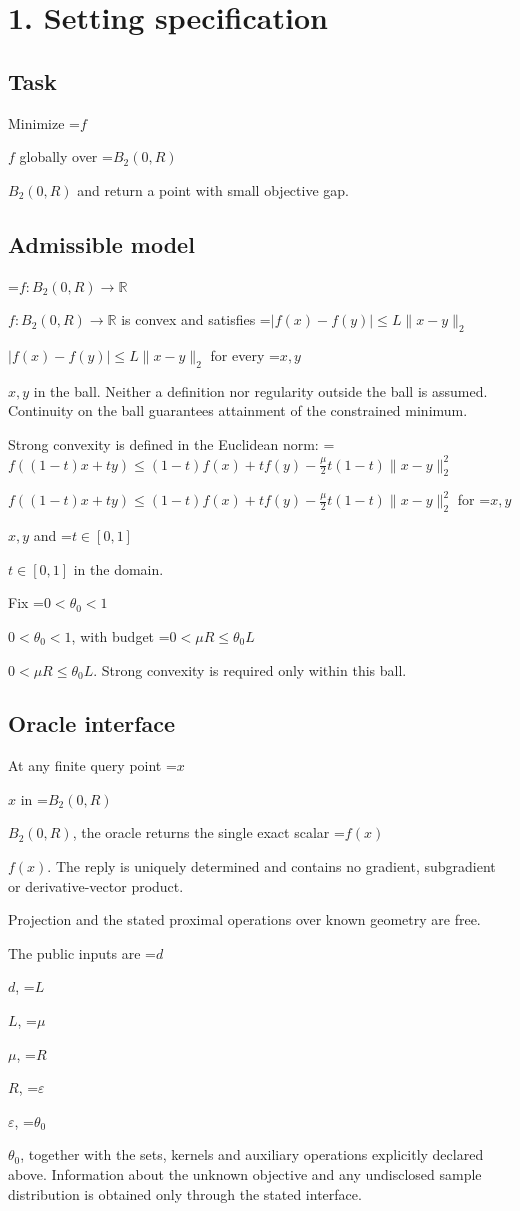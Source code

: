 \documentclass[10pt,a4paper]{article}
\newcommand{\AtlasMath}[1]{\par\begingroup\centering\setbox0=\hbox{$\displaystyle #1$}\ifdim\wd0>1.4\linewidth\typeout{ATLAS WIDE FORMULA: \the\wd0}\fi\ifdim\wd0>\linewidth\resizebox{\linewidth}{!}{\box0}\else\box0\fi\par\endgroup}
\newcommand{\AtlasInlineMath}[1]{\begingroup\setbox0=\hbox{$#1$}\ifdim\wd0>.4\linewidth\endgroup\AtlasMath{#1}\else\endgroup$#1$\fi}
\begin{document}
\section{1. Setting specification}


\subsection{Task}


Minimize \AtlasInlineMath{f} globally over \AtlasInlineMath{B_2(0,R)} and return a point with small objective gap.



\subsection{Admissible model}


\AtlasInlineMath{f:B_2(0,R)\to\mathbb{R}} is convex and satisfies \AtlasInlineMath{|f(x)-f(y)|\le L\|x-y\|_2} for every \AtlasInlineMath{x,y} in the ball. Neither a definition nor regularity outside the ball is assumed. Continuity on the ball guarantees attainment of the constrained minimum.



Strong convexity is defined in the Euclidean norm: \AtlasInlineMath{f((1-t)x+ty)\le(1-t)f(x)+tf(y)-\frac{\mu}{2}t(1-t)\|x-y\|_2^2} for \AtlasInlineMath{x,y} and \AtlasInlineMath{t\in[0,1]} in the domain.



Fix \AtlasInlineMath{0<\theta_0<1}, with budget \AtlasInlineMath{0<\mu R\le\theta_0L}. Strong convexity is required only within this ball.



\subsection{Oracle interface}


At any finite query point \AtlasInlineMath{x} in \AtlasInlineMath{B_2(0,R)}, the oracle returns the single exact scalar \AtlasInlineMath{f(x)}. The reply is uniquely determined and contains no gradient, subgradient or derivative-vector product.



Projection and the stated proximal operations over known geometry are free.



The public inputs are \AtlasInlineMath{d}, \AtlasInlineMath{L}, \AtlasInlineMath{\mu}, \AtlasInlineMath{R}, \AtlasInlineMath{\varepsilon}, \AtlasInlineMath{\theta_0}, together with the sets, kernels and auxiliary operations explicitly declared above. Information about the unknown objective and any undisclosed sample distribution is obtained only through the stated interface.
\end{document}
